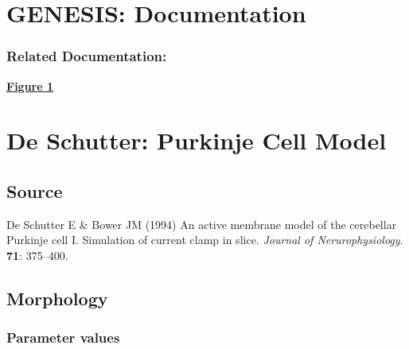 \documentclass[12pt]{article}
\begin{document}
\section*{GENESIS: Documentation}

\subsubsection*{\bf Related Documentation:}
\href{../pub-purkinje-deschutter-fig-1/pub-purkinje-deschutter-fig-1.tex}{\bf Figure 1}

\section*{De Schutter: Purkinje Cell Model}

\subsection*{Source}

De Schutter E \& Bower JM (1994) An active membrane model of the cerebellar Purkinje cell I. Simulation of current clamp in slice. {\it Journal of Nerurophysiology}. {\bf 71}: 375--400.

\subsection*{Morphology}

\subsubsection*{Parameter values}
\end{document}
